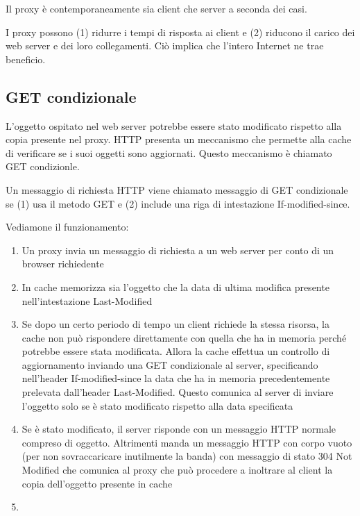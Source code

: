 \documentclass{book}
\begin{document}
Il proxy è contemporaneamente sia client che server a seconda dei casi.

I proxy possono (1) ridurre i tempi di risposta ai client e (2) riducono il carico dei web server e dei loro collegamenti. Ciò implica che l'intero Internet ne trae beneficio.

\subsection*{GET condizionale}
L'oggetto ospitato nel web server potrebbe essere stato modificato rispetto alla copia presente nel proxy. HTTP presenta un meccanismo che permette alla cache di verificare se i suoi oggetti sono aggiornati. Questo meccanismo è chiamato GET condizionle.

Un messaggio di richiesta HTTP viene chiamato messaggio di GET condizionale se (1) usa il metodo GET e (2) include una riga di intestazione If-modified-since.

Vediamone il funzionamento:
\begin{enumerate}
	\item Un proxy invia un messaggio di richiesta a un web server per conto di un browser richiedente
	\item In cache memorizza sia l'oggetto che la data di ultima modifica presente nell'intestazione Last-Modified
	\item Se dopo un certo periodo di tempo un client richiede la stessa risorsa, la cache non può rispondere direttamente con quella che ha in memoria perché potrebbe essere stata modificata. Allora la cache effettua un controllo di aggiornamento inviando una GET condizionale al server, specificando nell'header If-modified-since la data che ha in memoria precedentemente prelevata dall'header Last-Modified. Questo comunica al server di inviare l'oggetto solo se è stato modificato rispetto alla data specificata
	\item Se è stato modificato, il server risponde con un messaggio HTTP normale compreso di oggetto. Altrimenti manda un messaggio HTTP con corpo vuoto (per non sovraccaricare inutilmente la banda) con messaggio di stato 304 Not Modified che comunica al proxy che può procedere a inoltrare al client la copia dell'oggetto presente in cache
	\item 
\end{enumerate}
\end{document}
